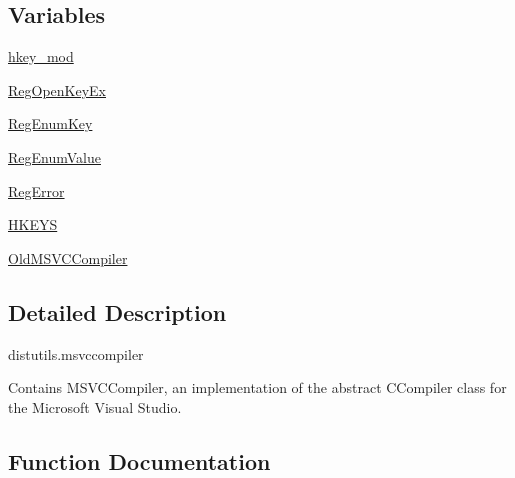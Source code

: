 \subsection*{Variables}
\begin{DoxyCompactItemize}
\item 
\hyperlink{namespacesetuptools_1_1__distutils_1_1msvccompiler_a85d92ac678370cbcc92bddcfb292e3f4}{hkey\+\_\+mod}
\item 
\hyperlink{namespacesetuptools_1_1__distutils_1_1msvccompiler_a8eda0e6396de8e0e7f5904463017af01}{Reg\+Open\+Key\+Ex}
\item 
\hyperlink{namespacesetuptools_1_1__distutils_1_1msvccompiler_a152598afc321ef63df0f54d5f3f83743}{Reg\+Enum\+Key}
\item 
\hyperlink{namespacesetuptools_1_1__distutils_1_1msvccompiler_abdd4bd2aeff6098d4dc5ab86f07fce2c}{Reg\+Enum\+Value}
\item 
\hyperlink{namespacesetuptools_1_1__distutils_1_1msvccompiler_aec5d98882d4cdc1402b9ed2a6f3886a0}{Reg\+Error}
\item 
\hyperlink{namespacesetuptools_1_1__distutils_1_1msvccompiler_a415dd3526deee25f803c02c19c1b6134}{H\+K\+E\+YS}
\item 
\hyperlink{namespacesetuptools_1_1__distutils_1_1msvccompiler_aecc8dd2bee9f72156c0677936b2b626a}{Old\+M\+S\+V\+C\+Compiler}
\end{DoxyCompactItemize}


\subsection{Detailed Description}
\begin{DoxyVerb}distutils.msvccompiler

Contains MSVCCompiler, an implementation of the abstract CCompiler class
for the Microsoft Visual Studio.
\end{DoxyVerb}
 

\subsection{Function Documentation}
\mbox{\label{namespacesetuptools_1_1__distutils_1_1msvccompiler_aa0247cf20fe2ba8465368129bc16f361}} 
